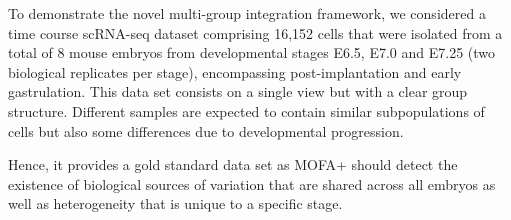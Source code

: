 To demonstrate the novel multi-group integration framework, we considered a time course scRNA-seq dataset comprising 16,152 cells that were isolated from a total of 8 mouse embryos from developmental stages E6.5, E7.0 and E7.25 (two biological replicates per stage), encompassing post-implantation and early gastrulation. This data set consists on a single view but with a clear group structure. Different samples are expected to contain similar subpopulations of cells but also some differences due to developmental progression. 

Hence, it provides a gold standard data set as MOFA+ should detect the existence of biological sources of variation that are shared across all embryos as well as heterogeneity that is unique to a specific stage. 





